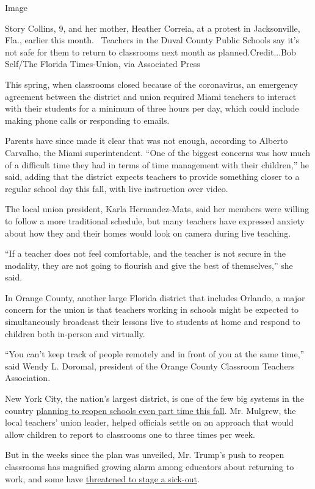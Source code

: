 Image

Story Collins, 9, and her mother, Heather Correia, at a protest in
Jacksonville, Fla., earlier this month.~ Teachers in the Duval County
Public Schools say it's not safe for them to return to classrooms next
month as planned.Credit...Bob Self/The Florida Times-Union, via
Associated Press

This spring, when classrooms closed because of the coronavirus, an
emergency agreement between the district and union required Miami
teachers to interact with their students for a minimum of three hours
per day, which could include making phone calls or responding to emails.

Parents have since made it clear that was not enough, according to
Alberto Carvalho, the Miami superintendent. ``One of the biggest
concerns was how much of a difficult time they had in terms of time
management with their children,'' he said, adding that the district
expects teachers to provide something closer to a regular school day
this fall, with live instruction over video.

The local union president, Karla Hernandez-Mats, said her members were
willing to follow a more traditional schedule, but many teachers have
expressed anxiety about how they and their homes would look on camera
during live teaching.

``If a teacher does not feel comfortable, and the teacher is not secure
in the modality, they are not going to flourish and give the best of
themselves,'' she said.

In Orange County, another large Florida district that includes Orlando,
a major concern for the union is that teachers working in schools might
be expected to simultaneously broadcast their lessons live to students
at home and respond to children both in-person and virtually.

``You can't keep track of people remotely and in front of you at the
same time,'' said Wendy L. Doromal, president of the Orange County
Classroom Teachers Association.

New York City, the nation's largest district, is one of the few big
systems in the country
\href{https://www.nytimes3xbfgragh.onion/2020/07/08/nyregion/nyc-schools-reopening-plan.html}{planning
to reopen schools even part time this fall}. Mr. Mulgrew, the local
teachers' union leader, helped officials settle on an approach that
would allow children to report to classrooms one to three times per
week.

But in the weeks since the plan was unveiled, Mr. Trump's push to reopen
classrooms has magnified growing alarm among educators about returning
to work, and some have
\href{https://twitter.com/Liat_RO/status/1281288365472649216}{threatened
to stage a sick-out}.

